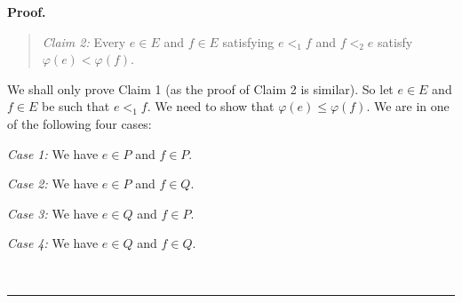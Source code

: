 \documentclass[numbers=enddot,12pt,final,onecolumn,notitlepage,abstracton]{scrartcl}
\theoremstyle{definition}
\newenvironment{statement}{\begin{quote}}{\end{quote}}
\newenvironment{proof}[1][Proof]{\noindent\textbf{#1.} }{\ \rule{0.5em}{0.5em}}
\newenvironment{verlong}{}{}
\begin{document}
\begin{verlong}
\begin{proof}
\begin{statement}
\textit{Claim 2:} Every $e\in E$ and $f\in E$ satisfying $e<_{1}f$ and
$f<_{2}e$ satisfy $\varphi\left(  e\right)  <\varphi\left(  f\right)  $.
\end{statement}

We shall only prove Claim 1 (as the proof of Claim 2 is similar). So let $e\in
E$ and $f\in E$ be such that $e<_{1}f$. We need to show that $\varphi\left(
e\right)  \leq\varphi\left(  f\right)  $. We are in one of the following four cases:

\textit{Case 1:} We have $e\in P$ and $f\in P$.

\textit{Case 2:} We have $e\in P$ and $f\in Q$.

\textit{Case 3:} We have $e\in Q$ and $f\in P$.

\textit{Case 4:} We have $e\in Q$ and $f\in Q$.


\end{proof}
\end{verlong}
\end{document}
